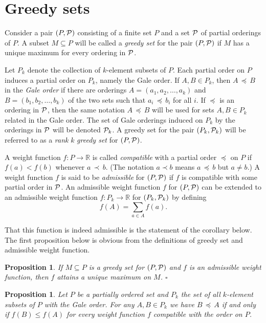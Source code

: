 \documentclass[12pt]{article}
\newcommand{\R}{{\mathbb R}}
\newcommand{\p}{{\preceq}}
\renewcommand{\P}{{\cal P}}
\newcommand{\qed}{\hspace{\fill}$\square$}
\newtheorem{prop}[equation]{Proposition}
\begin{document}
\section{Greedy sets} \label{greedy}
\setcounter{equation}{0}

Consider a pair $(P,\P)$ consisting
of a finite set $P$ and a set $\P$ of partial orderings of $P$.  A
subset $M \subseteq P$ will be called a {\it greedy set} for the pair
$(P,\P)$ if $M$ has a unique maximum for every ordering in $\P$.

Let $P_k$ denote the collection of $k$-element subsets of $P$.  Each
partial order on $P$ induces a partial order on $P_k$, namely the Gale
order.  If $A,B \in P_k$, then $A \,\p \, B$ in the {\it Gale order}
if there are orderings $A=(a_1, a_2, \dots, a_k)$ and $B =
(b_1,b_2,\dots,b_k)$ of the two sets such that $a_i\, \p \,b_i$ for
all $i$.  If $\p$ is an ordering in $\P$, then the same notation $A
\,\p \, B$ will be used for sets $A, B \in P_k$ related in the Gale
order.  The set of Gale orderings induced on $P_k$ by the orderings in
$\P$ will be denoted $\P_k$.  A greedy set for the pair $(P_k, \P_k)$
will be referred to as a {\it rank} $k$ {\it greedy set} for $(P,\P)$.

A weight function $f : P \rightarrow \R$ is called {\it compatible}
with a partial order $\p$ on $P$ if $f(a) < f(b)$ whenever
$a \,\prec \, b$.  (The notation $a \prec b$ means $a \,\p\, b$ but $a
\neq b$.)  A weight function $f$ is said to be {\it admissible} for
$(P,\P)$ if $f$ is compatible with some partial order in $\P$.  An
admissible weight function $f$ for $(P,\P)$ can be extended to an
admissible weight function $f: P_k \rightarrow \R$ for $(P_k, \P_k)$
by defining
$$f(A) = \sum_{a\in A} f(a).$$

\noindent That this function is indeed admissible is the statement of
the corollary below.  The first proposition below is obvious from the
definitions of greedy set and admissible weight function.

\begin{prop} \label{max} If $M \subseteq P$ is a greedy
set for $(P,\P)$ and $f$ is an admissible weight function, then $f$
attains a unique maximum on $M$.  \qed
\end{prop}

\begin{prop} \label{weight} Let $P$ be a partially ordered set
and $P_k$ the set of all $k$-element subsets of $P$ with the Gale
order.  For any $A,B \in P_k$ we have $B \,\p \, A$ if and only if $f
(B) \leq f (A)$ for every weight function $f$ compatible with the
order on $P$.
\end{prop}
\end{document}
